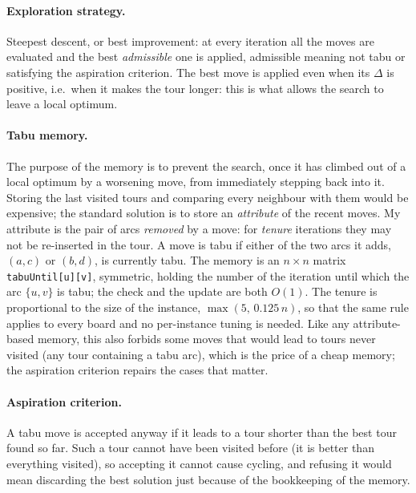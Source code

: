 \documentclass[11pt,a4paper]{article}
\begin{document}
\paragraph{Exploration strategy.}
Steepest descent, or best improvement: at every iteration all the moves are evaluated and the
best \emph{admissible} one is applied, admissible meaning not tabu or satisfying the
aspiration criterion. The best move is applied even when its $\Delta$ is positive, i.e.\ when
it makes the tour longer: this is what allows the search to leave a local optimum.

\paragraph{Tabu memory.}
The purpose of the memory is to prevent the search, once it has climbed out of a local
optimum by a worsening move, from immediately stepping back into it. Storing the last visited
tours and comparing every neighbour with them would be expensive; the standard solution is to
store an \emph{attribute} of the recent moves. My attribute is the pair of arcs \emph{removed}
by a move: for \emph{tenure} iterations they may not be re-inserted in the tour. A move is
tabu if either of the two arcs it adds, $(a,c)$ or $(b,d)$, is currently tabu. The memory is
an $n\times n$ matrix \texttt{tabuUntil[u][v]}, symmetric, holding the number of the
iteration until which the arc $\{u,v\}$ is tabu; the check and the update are both $O(1)$. The
tenure is proportional to the size of the instance, $\max(5,\,0.125\,n)$, so that the same
rule applies to every board and no per-instance tuning is needed. Like any attribute-based
memory, this also forbids some moves that would lead to tours never visited (any tour
containing a tabu arc), which is the price of a cheap memory; the aspiration criterion
repairs the cases that matter.

\paragraph{Aspiration criterion.}
A tabu move is accepted anyway if it leads to a tour shorter than the best tour found so far.
Such a tour cannot have been visited before (it is better than everything visited), so
accepting it cannot cause cycling, and refusing it would mean discarding the best solution
just because of the bookkeeping of the memory.
\end{document}
